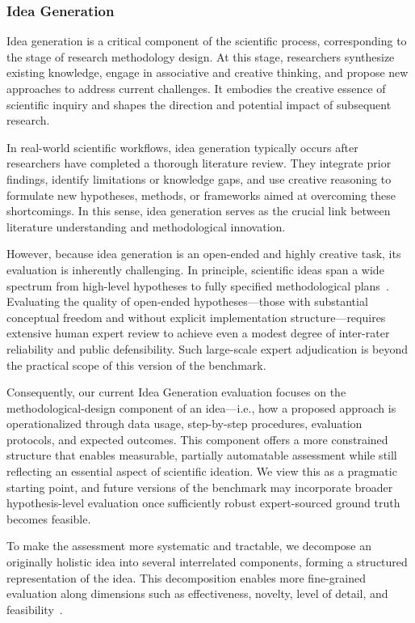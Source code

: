 \subsubsection{Idea Generation}
\label{sec: Idea gen}
Idea generation is a critical component of the scientific process, corresponding to the stage of research methodology design. At this stage, researchers synthesize existing knowledge, engage in associative and creative thinking, and propose new approaches to address current challenges. It embodies the creative essence of scientific inquiry and shapes the direction and potential impact of subsequent research.

In real-world scientific workflows, idea generation typically occurs after researchers have completed a thorough literature review. They integrate prior findings, identify limitations or knowledge gaps, and use creative reasoning to formulate new hypotheses, methods, or frameworks aimed at overcoming these shortcomings. In this sense, idea generation serves as the crucial link between literature understanding and methodological innovation. 

However, because idea generation is an open-ended and highly creative task, its evaluation is inherently challenging. In principle, scientific ideas span a wide spectrum from high-level hypotheses to fully specified methodological plans~\cite{Wan2025DeepResearchAT, popper2005logic, yang2024moose}. Evaluating the quality of open-ended hypotheses—those with substantial conceptual freedom and without explicit implementation structure—requires extensive human expert review to achieve even a modest degree of inter-rater reliability and public defensibility. Such large-scale expert adjudication is beyond the practical scope of this version of the benchmark.

Consequently, our current Idea Generation evaluation focuses on the methodological-design component of an idea—i.e., how a proposed approach is operationalized through data usage, step-by-step procedures, evaluation protocols, and expected outcomes. This component offers a more constrained structure that enables measurable, partially automatable assessment while still reflecting an essential aspect of scientific ideation. We view this as a pragmatic starting point, and future versions of the benchmark may incorporate broader hypothesis-level evaluation once sufficiently robust expert-sourced ground truth becomes feasible.

To make the assessment more systematic and tractable, we decompose an originally holistic idea into several interrelated components, forming a structured representation of the idea. This decomposition enables more fine-grained evaluation along dimensions such as effectiveness, novelty, level of detail, and feasibility~\cite{moose}.

